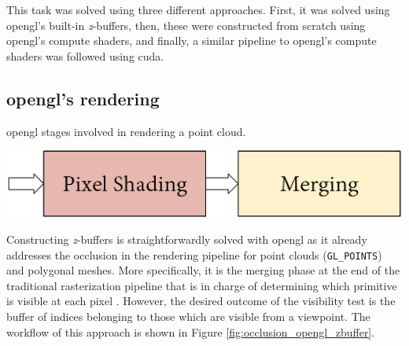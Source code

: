 This task was solved using three different approaches. First, it was solved using \acrshort{opengl}'s built-in \textit{z}-buffers, then, these were constructed from scratch using \acrshort{opengl}'s compute shaders, and finally, a similar pipeline to \acrshort{opengl}'s compute shaders was followed using \acrshort{cuda}.

\newcommand{\Points}{\textrm{P}\textsubscript{\acrshort{gpu}}}
\newcommand{\Viewpoints}{\textrm{V}\textsubscript{\acrshort{cpu}}}
\newcommand{\Space}{\hspace{1mm}}
\newcommand{\Zbuffer}{z\textrm{-buffer}\textsubscript{GPU}}
\newcommand{\ZbufferCPU}{z\textrm{-buffer}\textsubscript{CPU}}
\newcommand{\Indices}{\textrm{indices}\textsubscript{\acrshort{gpu}}}
\newcommand{\Codes}{\textrm{codes}\textsubscript{\acrshort{gpu}}}
\newcommand{\PCCardinality}{|\Points|}
\newcommand{\LeftPoints}{\textrm{n}_\textsubscript{left}}
\newcommand{\CurrentPoints}{\textrm{n}_\textsubscript{current}}
\newcommand{\MaxPoints}{\textrm{n}_\textsubscript{max}}
\newcommand{\NumGroups}{\textrm{n}_\textsubscript{groups}}
\newcommand{\Pointa}{\textrm{p}\textsubscript{3D}}
\newcommand{\Pointb}{\textrm{p}\textsubscript{2D}}

\subsection{\acrshort{opengl}'s rendering}

\begin{marginfigure}[.cm]
    \caption{\acrshort{opengl} stages involved in rendering a point cloud.}
    \label{fig:occlusion_opengl_zbuffer_core}
    \includegraphics[width=\linewidth]{figs/multi_thermal_projection/occlusion_opengl_core.png}
\end{marginfigure}
Constructing \textit{z}-buffers is straightforwardly solved with \acrshort{opengl} as it already addresses the occlusion in the rendering pipeline for point clouds (\verb|GL_POINTS|) and polygonal meshes. More specifically, it is the merging phase at the end of the traditional rasterization pipeline that is in charge of determining which primitive is visible at each pixel \cite{akenine-moller_real-time_2018}. However, the desired outcome of the visibility test is the buffer of indices belonging to those which are visible from a viewpoint. The workflow of this approach is shown in Figure \ref{fig:occlusion_opengl_zbuffer}.

